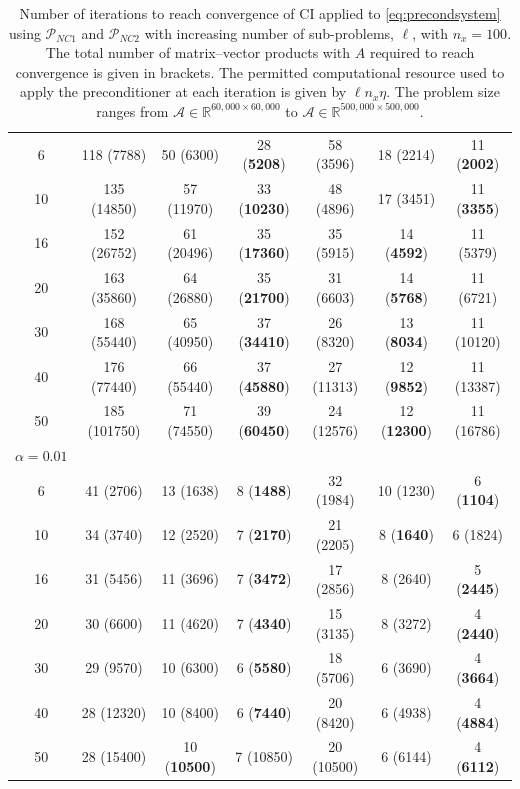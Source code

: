 \documentclass{article}
\newcommand{\resource}{\eta}
\theoremstyle{definition}
\begin{document}
{\begin{table}[]
\begin{tabular}{c|ccc|ccc}
				6  &    118  (7788) &  50 (6300)&  28 (\textbf{5208})  & 58 (3596) & 18 (2214) & 11 (\textbf{2002})\\
				10  & 135	(14850)	&57	(11970)&	33	(\textbf{10230})	&48	(4896)&	17	(3451)&	11	(\textbf{3355}) \\
				16 & 152	({26752})	&61	(20496)	&35	(\textbf{17360})	&35	(5915)	&14	(\textbf{4592})	&11	(5379) \\
				20 & 163	(35860)	&64	(26880)&	35	(\textbf{21700})	&31	(6603)	&14	(\textbf{5768})	&11	(6721)\\
				30 & 168	(55440)&	65	(40950)	&37	(\textbf{34410})	&26	({8320})	&13	({\textbf{8034}})	&11	(10120)\\
				40 &  176	(77440)	&66	(55440)	&37	(\textbf{45880})	&27	({11313})	&12	(\textbf{9852})	&11	(13387)\\
				50& 185	(101750)	&71	(74550)	&39	(\textbf{60450})	&24	({12576}) &	12	(\textbf{12300})	&11	(16786)\\
				\hline
				$\alpha=0.01$&&&&&&\\ \hline   
				6 &  41	(2706)	&13	(1638)&	8	(\textbf{1488})	&32	(1984)&	10	(1230)	&6	(\textbf{1104})   \\
				10&34	(3740)	&12	(2520)&	7	(\textbf{2170})	&21	(2205)	&8	(\textbf{1640})	&6	(1824) \\
				16&31	(5456)	&11	(3696)&	7	(\textbf{3472})	&17	(2856)&	8	(2640)	&5	(\textbf{2445}) \\
				20& 30	(6600)	&11	(4620)&	7	(\textbf{4340})	&15	(3135)&	8	(3272)	&4	(\textbf{2440})\\
				30&29	(9570)	&10	(6300)&	6	(\textbf{5580})	&18	(5706)&	6	({3690})	&4	(\textbf{3664}) \\
				40& 28	(12320)	&10	(8400)&	6	(\textbf{7440})	&20	(8420)&	6	({4938})	&4	(\textbf{4884}) \\
				50&  28	(15400)	&10	(\textbf{10500})&	7	(10850)	&20	(10500)	&6	({6144})	&4	(\textbf{6112}) \\
			\end{tabular}
			\caption{Number of iterations to reach convergence of CI applied to \eqref{eq:precondsystem} using $\mathcal{P}_{NC1}$ and $\mathcal{P}_{NC2}$ with increasing number of  sub-problems, $\ell$, with $n_x = 100$. The total number of matrix--vector products with $A$ required to reach convergence is given in brackets. The permitted computational resource used to apply the preconditioner at each iteration is given by $\ell n_x \resource$. The problem size ranges from $\mathcal{A}\in \mathbb{R}^{60,000\times 60,000}$ to $\mathcal{A}\in \mathbb{R}^{500,000\times 500,000}$. \label{tab:NCscalingwithl}}
		\end{table}
		
}
\end{document}

